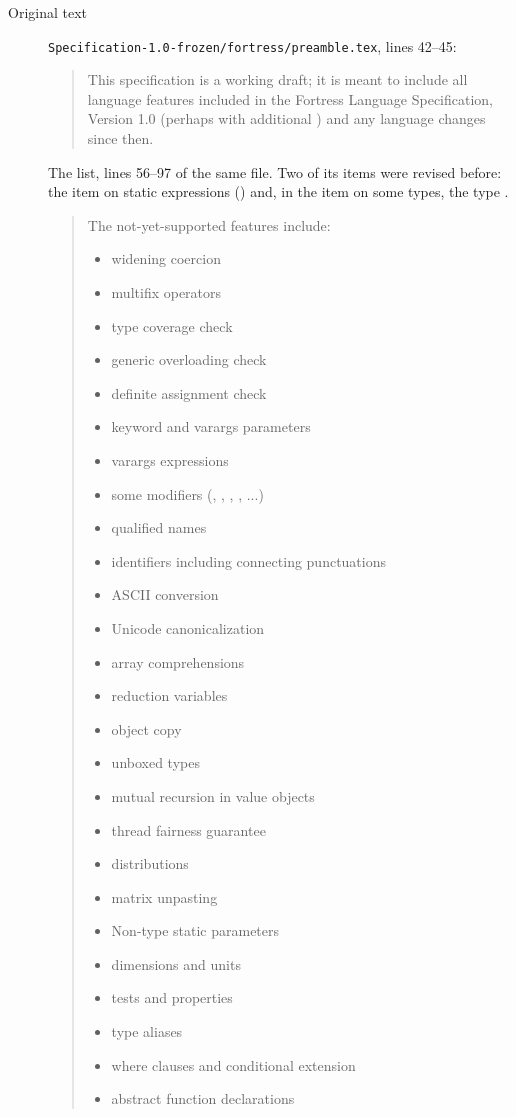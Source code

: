 \begin{description}
\item[Original text]
\nolinkurl{Specification-1.0-frozen/fortress/preamble.tex}, lines 42--45:
\begin{quote}
This specification is a working draft;
it is meant to include all language features included in
the Fortress Language Specification, Version 1.0\EXP{\beta{}}
(perhaps with additional ) and any language changes since then.
\end{quote}
The list, lines 56--97 of the same file.
Two of its items were revised before: the item on static expressions
() and, in the item on some types, the type
.
\begin{quote}
The not-yet-supported features include:
\begin{itemize}
\item widening coercion
\item multifix operators
\item type coverage check
\item generic overloading check
\item definite assignment check
\item keyword and varargs parameters
\item varargs expressions
\item some modifiers (, , , , ...)
\item qualified names
\item identifiers including connecting punctuations
\item ASCII conversion
\item Unicode canonicalization
\item array comprehensions
\item reduction variables
\item object copy
\item unboxed types
\item mutual recursion in value objects
\item thread fairness guarantee
\item distributions
\item matrix unpasting
\item Non-type static parameters
\item dimensions and units
\item tests and properties
\item type aliases
\item where clauses and conditional extension
\item abstract function declarations

\end{itemize}
\end{quote}
\end{description}
